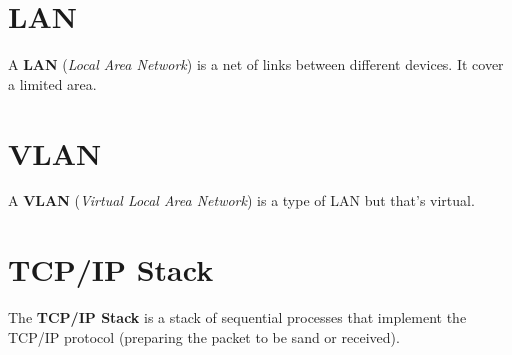 \section{LAN}
A \textbf{LAN} (\textit{Local Area Network}) is a net of links between different devices. It cover a limited area.

\section{VLAN}
A \textbf{VLAN} (\textit{Virtual Local Area Network}) is a type of LAN but that's virtual.

\section{TCP/IP Stack}
The \textbf{TCP/IP Stack} is a stack of sequential processes that implement the TCP/IP protocol (preparing the packet to be sand or received). 
